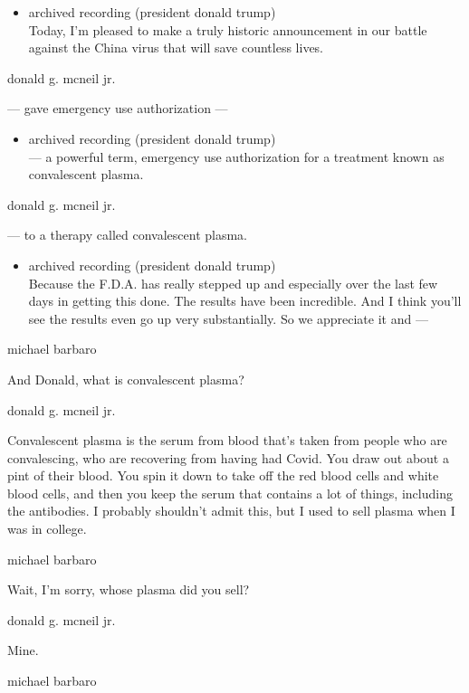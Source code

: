 \begin{itemize}
\tightlist
\item
  archived recording (president donald trump)\\
  Today, I'm pleased to make a truly historic announcement in our battle
  against the China virus that will save countless lives.
\end{itemize}

donald g. mcneil jr.

--- gave emergency use authorization ---

\begin{itemize}
\tightlist
\item
  archived recording (president donald trump)\\
  --- a powerful term, emergency use authorization for a treatment known
  as convalescent plasma.
\end{itemize}

donald g. mcneil jr.

--- to a therapy called convalescent plasma.

\begin{itemize}
\tightlist
\item
  archived recording (president donald trump)\\
  Because the F.D.A. has really stepped up and especially over the last
  few days in getting this done. The results have been incredible. And I
  think you'll see the results even go up very substantially. So we
  appreciate it and ---
\end{itemize}

michael barbaro

And Donald, what is convalescent plasma?

donald g. mcneil jr.

Convalescent plasma is the serum from blood that's taken from people who
are convalescing, who are recovering from having had Covid. You draw out
about a pint of their blood. You spin it down to take off the red blood
cells and white blood cells, and then you keep the serum that contains a
lot of things, including the antibodies. I probably shouldn't admit
this, but I used to sell plasma when I was in college.

michael barbaro

Wait, I'm sorry, whose plasma did you sell?

donald g. mcneil jr.

Mine.

michael barbaro

